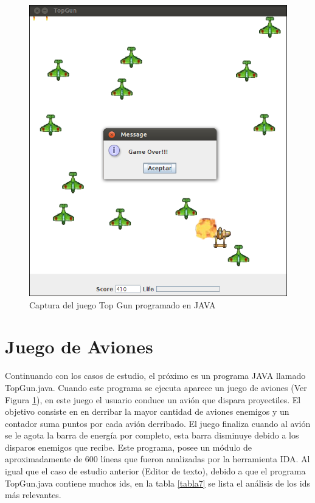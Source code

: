 \begin{figure}[t!] %
\centerline{%
\includegraphics[scale= 0.72]{./cap5/caso_03.png}
}
\caption{Captura del juego Top Gun programado en JAVA}
\label{caso3}
\end{figure}


\section{Juego de Aviones}
 
Continuando con los casos de estudio, el próximo es un programa JAVA llamado TopGun.java. Cuando este programa se ejecuta aparece un juego de aviones (Ver Figura \ref{caso3}), en este juego el usuario conduce un avión que dispara proyectiles. El objetivo consiste en en derribar la mayor cantidad de aviones enemigos y un contador suma puntos por cada avión derribado. El juego finaliza cuando al avión se le agota la barra de energía por completo, esta barra disminuye debido a los disparos enemigos que recibe.
Este programa, posee un módulo de aproximadamente de 600 líneas que fueron analizadas por la herramienta IDA.
Al igual que el caso de estudio anterior (Editor de texto), debido a que el programa TopGun.java contiene muchos ids, en la tabla \ref{tabla7} se lista el análisis de los ids más relevantes.\\

